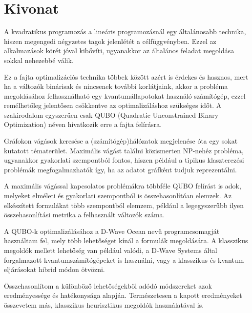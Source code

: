 \setcounter{page}{1}

\selecthungarian

\chapter*{Kivonat}

A kvadratikus programozás a lineáris programozásnál egy általánosabb technika, hiszen megengedi négyzetes tagok jelenlétét a célfüggvényben. Ezzel az alkalmazások körét jóval kibővíti, ugyanakkor az általános feladat megoldása sokkal nehezebbé válik.

Ez a fajta optimalizációs technika többek között azért is érdekes és hasznos, mert ha a változók binárisak és nincsenek további korlátjaink, akkor a probléma megoldásához felhasználható egy kvantumállapotokat használó számítógép, ezzel remélhetőleg jelentősen csökkentve az optimalizáláshoz szükséges időt. A szakirodalom egyszerűen csak QUBO (Quadratic Unconstrained Binary Optimization) néven hivatkozik erre a fajta felírásra.

Gráfokon vágások keresése a (számítógép)hálózatok megjelenése óta egy sokat kutatott tématerület. Maximális vágást találni közismerten NP-nehéz probléma, ugyanakkor gyakorlati szempontból fontos, hiszen például a tipikus klaszterezési problémák megfogalmazhatók így, ha az adatot gráfként tudjuk reprezentálni.

A maximális vágással kapcsolatos problémákra többféle QUBO felírást is adok, melyeket elméleti és gyakorlati szempontból is összehasonlítóan elemzek. Az elkészített formulákat több szempontból elemzem, például a legegyszerűbb ilyen összehasonlítási metrika a felhasznált változók száma.


A QUBO-k optimalizálásához a  D-Wave Ocean nevű programcsomagját használtam fel, mely több lehetőséget kínál a formulák megoldására. A klasszikus megoldók mellett lehetőség van például valódi, a D-Wave Systems által forgalmazott kvantumszámítógépeket is használni, vagy a klasszikus és kvantum eljárásokat hibrid módon ötvözni.

Összehasonlítom a különböző lehetőségekből adódó módszereket azok eredményessége és hatékonysága alapján.
Természetesen a kapott eredményeket összevetem más, klasszikus heurisztikus megoldók használatával is.

